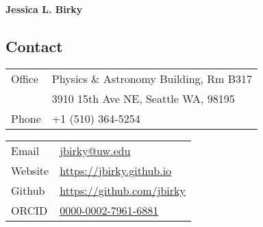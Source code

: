 \documentclass[margin,line]{resume}
\begin{document}
{\sc \textbf{\Large Jessica L. Birky}} 
\vspace{0.3cm}
\begin{resume}

 
\section{\mysidestyle \textcolor{bcolor}{Contact}}


\noindent\begin{multicols}{2}\small
\noindent\begin{tabular}{@{}l|l}
  \multirow{1}{*}{Office}   & Physics \& Astronomy Building, Rm B317  \\
  \multirow{1}{*}{}         & 3910 15th Ave NE, Seattle WA, 98195  \\
  \multirow{1}{*}{Phone}    & +1 (510) 364-5254 \\
\end{tabular}

\noindent\begin{tabular}{@{}l|l}
  \multirow{1}{*}{Email}    &   \href{jbirky@ucsd.edu}{jbirky@uw.edu} \\
  \multirow{1}{*}{Website}  &   \href{https://jbirky.github.io/}{https://jbirky.github.io} \\
  \multirow{1}{*}{Github}   &   \href{https://github.com/jbirky}{https://github.com/jbirky} \\
  \multirow{1}{*}{ORCID}    &    \href{https://orcid.org/0000-0002-7961-6881}{0000-0002-7961-6881} \\
\end{tabular} 
\end{multicols}


\end{resume}
\end{document}
